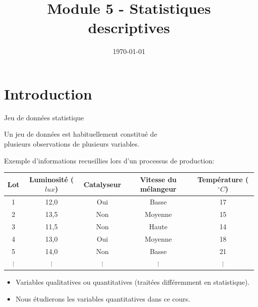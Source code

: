 \documentclass{BeamerTemplate}
\title{Module 5 - Statistiques descriptives}
\date{\today}
\begin{document}
\begin{frame}[t]
  \titlepage
\end{frame}








\section{Introduction}

\begin{frame}[t]{Jeu de données statistique}

Un jeu de données est habituellement constitué de \\\alert{plusieurs observations} de \alert{plusieurs variables}. \\

\medskip
{\small
Exemple d'informations recueillies lors d'un processus de production:

{\scriptsize
\begin{center}
\begin{tabular}{ccccc}\hline
Lot & Luminosité ($lux$) & Catalyseur & Vitesse du mélangeur & Température ($^\circ C$) \\ \hline
1 & 12,0 & Oui & Basse & 17 \\
2 & 13,5 & Non & Moyenne & 15 \\
3 & 11,5 & Non & Haute & 14 \\
4 & 13,0 & Oui & Moyenne & 18 \\
5 & 14,0 & Non & Basse & 21 \\
$\vdots$&$\vdots$&$\vdots$&$\vdots$&$\vdots$\\\hline
\end{tabular}
\end{center}
}

\begin{itemize}
\item Variables qualitatives ou quantitatives (traitées différemment en statistique).
\item Nous étudierons les variables \alert{quantitatives} dans ce cours.
\end{itemize}
}
\end{frame}
\end{document}
